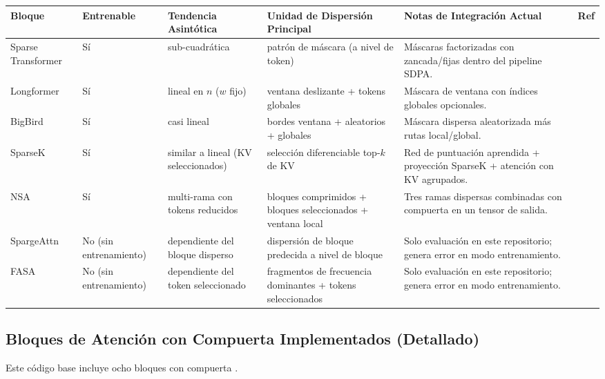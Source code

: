 \documentclass[11pt,a4paper]{article}
\begin{document}
\small
\begin{longtable}{p{2.5cm}p{1.6cm}p{1.9cm}p{2.4cm}p{4.1cm}p{1.5cm}}
\toprule
\textbf{Bloque} & \textbf{Entrenable} & \textbf{Tendencia Asintótica} & \textbf{Unidad de Dispersión Principal} & \textbf{Notas de Integración Actual} & \textbf{Ref} \\
\midrule
\endhead
Sparse Transformer & Sí & sub-cuadrática & patrón de máscara (a nivel de token) & Máscaras factorizadas con zancada/fijas dentro del pipeline SDPA. & \citep{child_sparse_transformer_2019} \\
Longformer & Sí & lineal en $n$ ($w$ fijo) & ventana deslizante + tokens globales & Máscara de ventana con índices globales opcionales. & \citep{beltagy_longformer_2020} \\
BigBird & Sí & casi lineal & bordes ventana + aleatorios + globales & Máscara dispersa aleatorizada más rutas local/global. & \citep{zaheer_bigbird_2020} \\
SparseK & Sí & similar a lineal (KV seleccionados) & selección diferenciable top-$k$ de KV & Red de puntuación aprendida + proyección SparseK + atención con KV agrupados. & \citep{lou_sparsek_2024} \\
NSA & Sí & multi-rama con tokens reducidos & bloques comprimidos + bloques seleccionados + ventana local & Tres ramas dispersas combinadas con compuerta en un tensor de salida. & \citep{yuan_nsa_2025} \\
SpargeAttn & No (sin entrenamiento) & dependiente del bloque disperso & dispersión de bloque predecida a nivel de bloque & Solo evaluación en este repositorio; genera error en modo entrenamiento. & \citep{zhang_spargeattn_2025} \\
FASA & No (sin entrenamiento) & dependiente del token seleccionado & fragmentos de frecuencia dominantes + tokens seleccionados & Solo evaluación en este repositorio; genera error en modo entrenamiento. & \citep{wang_fasa_2026} \\
\bottomrule
\end{longtable}
\normalsize

\subsection{Bloques de Atención con Compuerta Implementados (Detallado)}
Este código base incluye ocho bloques con compuerta \citep{yang_gla_2023,yang_deltanet_2024,yang_gated_deltanet_2024,hatamizadeh_gated_deltanet2_2026,sun_retentive_2023,qin_hgrn2_2024,lin_forgetting_transformer_2025,qiu_gated_attention_2025}.
\end{document}
